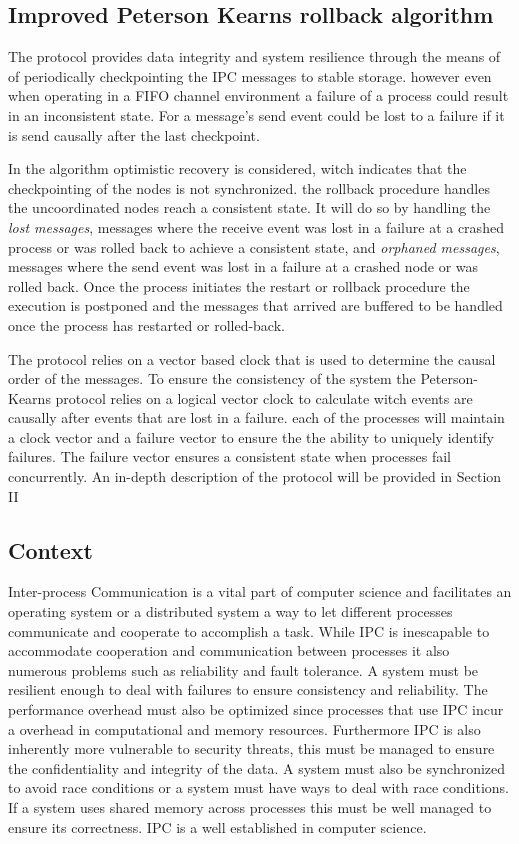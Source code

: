 \documentclass[twocolumn, a4paper,11pt]{article}%
\begin{document}
\subsection{Improved Peterson Kearns rollback algorithm}
\par The protocol provides data integrity and system resilience through the means of  of periodically checkpointing the IPC messages to stable storage. however even when operating in a FIFO channel environment  a failure of a process could result in an inconsistent state. For a message's send event could be lost to a failure if it is send causally after the last checkpoint. 
\par In the algorithm optimistic recovery is  considered, witch indicates that the checkpointing of the nodes is not synchronized. the rollback procedure handles the uncoordinated nodes reach a consistent state. It will do so by handling the \textit{lost messages}, messages where the receive event was lost in a failure at a crashed process or was rolled back to achieve a consistent state, and \textit{orphaned messages}, messages where the send event was lost in a failure at a crashed node or was rolled back. Once the process initiates the  restart or rollback procedure the execution is postponed and the messages that arrived are buffered to be handled once the process has restarted or rolled-back. 
\par The protocol relies on a vector based clock that is used to determine the causal order of the messages. To ensure the consistency of the system the Peterson-Kearns protocol relies on a logical vector clock to calculate witch events are causally after events that are lost in a failure.  each of the processes will maintain a clock vector and a failure vector  to ensure the the ability to uniquely identify failures. The failure vector ensures a consistent state when processes fail concurrently. An in-depth description of the protocol will be provided in Section II

\subsection{Context}
Inter-process Communication is a vital part of computer science and facilitates an operating system or a distributed system a way to let different processes communicate and cooperate to accomplish a task.  While IPC is inescapable to accommodate cooperation and communication between processes it also numerous problems such as reliability and fault tolerance. A system must be resilient enough to deal with failures to ensure consistency and reliability. The performance overhead must also be optimized since processes that use IPC incur a overhead in computational and memory resources. Furthermore IPC is also inherently more vulnerable to security threats, this must be managed to ensure the confidentiality and integrity of the data.  A system must also be synchronized  to avoid race conditions or a system must have ways to deal with race conditions. If a system uses shared memory across processes this must be well managed to ensure its correctness.
IPC is a well established in computer science. 
\end{document}
